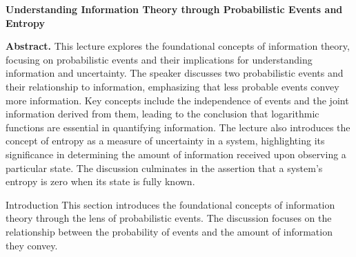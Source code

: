 \documentclass[a4paper]{article}
\begin{document}
\begin{center}
{\LARGE \textbf{Understanding Information Theory through Probabilistic Events and Entropy}}\\[1em]
\end{center}

\textbf{Abstract.} This lecture explores the foundational concepts of information theory, focusing on probabilistic events and their implications for understanding information and uncertainty. The speaker discusses two probabilistic events and their relationship to information, emphasizing that less probable events convey more information. Key concepts include the independence of events and the joint information derived from them, leading to the conclusion that logarithmic functions are essential in quantifying information. The lecture also introduces the concept of entropy as a measure of uncertainty in a system, highlighting its significance in determining the amount of information received upon observing a particular state. The discussion culminates in the assertion that a system's entropy is zero when its state is fully known.

\begin{section}{Introduction}
This section introduces the foundational concepts of information theory through the lens of probabilistic events. The discussion focuses on the relationship between the probability of events and the amount of information they convey.
\end{section}
\end{document}
